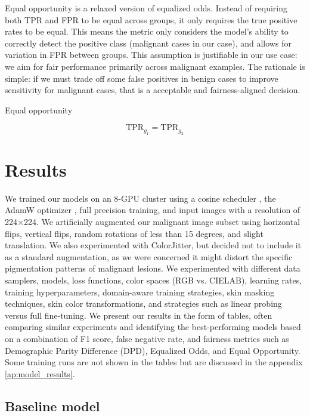 Equal opportunity is a relaxed version of equalized odds. Instead of requiring both TPR and FPR to be equal across groups, it only requires the true positive rates to be equal. This means the metric only considers the model’s ability to correctly detect the positive class (malignant cases in our case), and allows for variation in FPR between groups.
This assumption is justifiable in our use case: we aim for fair performance primarily across malignant examples. The rationale is simple: if we must trade off some false positives in benign cases to improve sensitivity  for malignant cases, that is a  acceptable and fairness-aligned decision.

\begin{myequation}
\caption{Equal opportunity}
\label{eq:equalized_opportunity}
\[
\text{TPR}_{g_1} = \text{TPR}_{g_2}
\]
\end{myequation}


\section{Results}
\label{sec:results}

We trained our models on an 8-GPU cluster using a cosine scheduler \cite{cosine_scheduler}, the AdamW optimizer \cite{adamw}, full precision training, and input images with a resolution of 224×224. We artificially augmented our malignant image subset using horizontal flips, vertical flips, random rotations of less than 15 degrees, and slight translation. We also experimented with ColorJitter, but decided not to include it as a standard augmentation, as we were concerned it might distort the specific pigmentation patterns of malignant lesions. We experimented with different data samplers, models, loss functions, color spaces (RGB vs. CIELAB), learning rates, training hyperparameters, domain-aware training strategies, skin masking techniques, skin color transformations, and strategies such as linear probing versus full fine-tuning. We present our results in the form of tables, often comparing similar experiments and identifying the best-performing models based on a combination of F1 score, false negative rate, and fairness metrics such as Demographic Parity Difference (DPD), Equalized Odds, and Equal Opportunity. Some training runs are not shown in the tables but are discussed in the appendix \ref{ap:model_results}.

\subsection{Baseline model}

